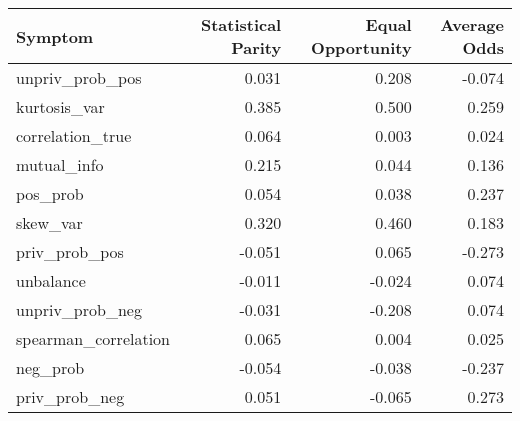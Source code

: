 \begin{tabular}{lrrr}
\toprule
Symptom & Statistical Parity & Equal Opportunity & Average Odds \\
\midrule
unpriv_prob_pos & 0.031 & 0.208 & -0.074 \\
kurtosis_var & 0.385 & 0.500 & 0.259 \\
correlation_true & 0.064 & 0.003 & 0.024 \\
mutual_info & 0.215 & 0.044 & 0.136 \\
pos_prob & 0.054 & 0.038 & 0.237 \\
skew_var & 0.320 & 0.460 & 0.183 \\
priv_prob_pos & -0.051 & 0.065 & -0.273 \\
unbalance & -0.011 & -0.024 & 0.074 \\
unpriv_prob_neg & -0.031 & -0.208 & 0.074 \\
spearman_correlation & 0.065 & 0.004 & 0.025 \\
neg_prob & -0.054 & -0.038 & -0.237 \\
priv_prob_neg & 0.051 & -0.065 & 0.273 \\
\bottomrule
\end{tabular}
